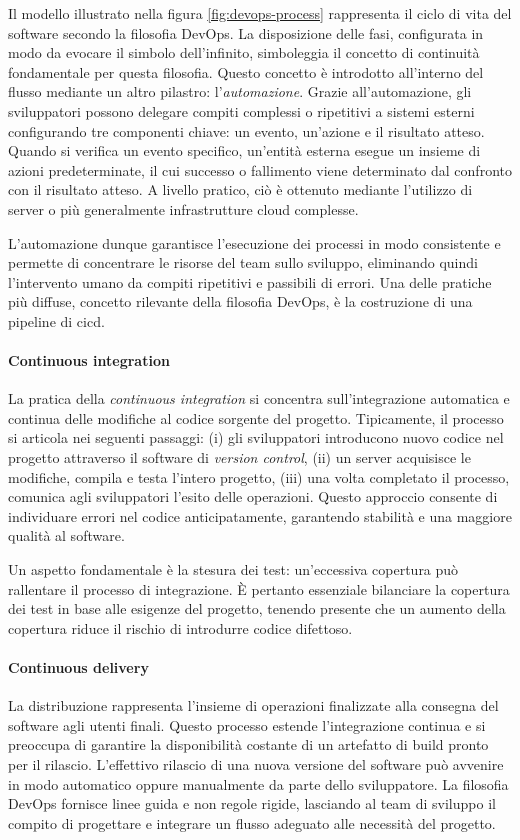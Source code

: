 Il modello illustrato nella figura \ref{fig:devops-process} rappresenta il ciclo di vita del software secondo la filosofia DevOps. La disposizione delle fasi, configurata in modo da evocare il simbolo dell'infinito, simboleggia il concetto di continuità fondamentale per questa filosofia. Questo concetto è introdotto all'interno del flusso mediante un altro pilastro: l'\textit{automazione}. Grazie all'automazione, gli sviluppatori possono delegare compiti complessi o ripetitivi a sistemi esterni configurando tre componenti chiave: un evento, un'azione e il risultato atteso. Quando si verifica un evento specifico, un'entità esterna esegue un insieme di azioni predeterminate, il cui successo o fallimento viene determinato dal confronto con il risultato atteso. A livello pratico, ciò è ottenuto mediante l'utilizzo di server o più generalmente infrastrutture cloud complesse.

L'automazione dunque garantisce l'esecuzione dei processi in modo consistente e permette di concentrare le risorse del team sullo sviluppo, eliminando quindi l'intervento umano da compiti ripetitivi e passibili di errori. Una delle pratiche più diffuse, concetto rilevante della filosofia DevOps, è la costruzione di una pipeline di \ac{cicd}.

\paragraph{Continuous integration} La pratica della \textit{continuous integration} si concentra sull'integrazione automatica e continua delle modifiche al codice sorgente del progetto. Tipicamente, il processo si articola nei seguenti passaggi: (i) gli sviluppatori introducono nuovo codice nel progetto attraverso il software di \textit{version control}, (ii) un server acquisisce le modifiche, compila e testa l'intero progetto, (iii) una volta completato il processo, comunica agli sviluppatori l'esito delle operazioni. Questo approccio consente di individuare errori nel codice anticipatamente, garantendo stabilità e una maggiore qualità al software.

Un aspetto fondamentale è la stesura dei test: un'eccessiva copertura può rallentare il processo di integrazione. È pertanto essenziale bilanciare la copertura dei test in base alle esigenze del progetto, tenendo presente che un aumento della copertura riduce il rischio di introdurre codice difettoso.

\paragraph{Continuous delivery} La distribuzione rappresenta l'insieme di operazioni finalizzate alla consegna del software agli utenti finali. Questo processo estende l'integrazione continua e si preoccupa di garantire la disponibilità costante di un artefatto di build pronto per il rilascio. L'effettivo rilascio di una nuova versione del software può avvenire in modo automatico oppure manualmente da parte dello sviluppatore. La filosofia DevOps fornisce linee guida e non regole rigide, lasciando al team di sviluppo il compito di progettare e integrare un flusso adeguato alle necessità del progetto.

